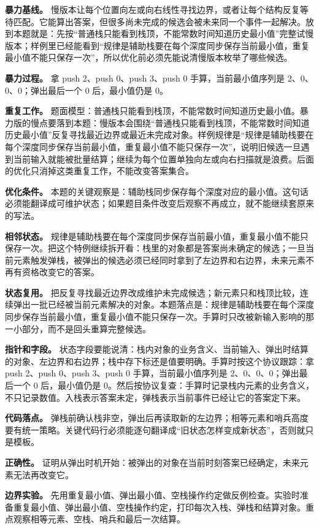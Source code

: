 \textbf{暴力基线。} 慢版本让每个位置向左或向右线性寻找边界，或者让每个结构反复等待匹配。它能算出答案，但很多尚未完成的候选会被未来同一个事件一起解决。放到本题就是：先按“普通栈只能看到栈顶，不能常数时间知道历史最小值”完整试慢版本；样例里已经能看到“规律是辅助栈要在每个深度同步保存当前最小值，重复最小值不能只保存一次”，所以优化前必须先能说清慢版本枚举了哪些候选。

\textbf{暴力过程。} 拿 push 2、push 0、push 3、push 0 手算，当前最小值序列是 2、0、0、0；弹出最后一个 0 后，最小值仍是 0。

\textbf{重复工作。} 题面模型：普通栈只能看到栈顶，不能常数时间知道历史最小值。暴力版的慢点要落到本题：慢版本会围绕“普通栈只能看到栈顶，不能常数时间知道历史最小值”反复寻找最近边界或最近未完成对象。样例规律是“规律是辅助栈要在每个深度同步保存当前最小值，重复最小值不能只保存一次”，说明旧候选一旦遇到当前输入就能被批量结算；继续为每个位置单独向左或向右扫描就是浪费。后面的优化只消掉这类重复工作，不能改变答案集合。

\textbf{优化条件。} 本题的关键观察是：辅助栈同步保存每个深度对应的最小值。这句话必须能翻译成可维护状态；如果题目条件改变后观察不再成立，就不能继续套原来的写法。

\textbf{相邻状态。} 规律是辅助栈要在每个深度同步保存当前最小值，重复最小值不能只保存一次。把这个特例继续拆开看：栈里的对象都是答案尚未确定的候选；一旦当前元素触发弹栈，被弹出的候选必须已经同时拿到了左边界和右边界，未来元素不再有资格改变它的答案。

\textbf{状态复用。} 把反复寻找最近边界改成维护未完成候选；新元素只和栈顶比较，连续弹出一批已经被当前元素解决的对象。本题落点是：规律是辅助栈要在每个深度同步保存当前最小值，重复最小值不能只保存一次。手算时只改被新输入影响的那一小部分，而不是回头重算完整候选。

\textbf{指针和字段。} 状态字段要能说清：栈内对象的业务含义、当前输入、弹出时结算的对象、左边界和右边界；栈中存下标还是值要明确。手算时按这个协议跟踪：拿 push 2、push 0、push 3、push 0 手算，当前最小值序列是 2、0、0、0；弹出最后一个 0 后，最小值仍是 0。然后按协议复查：手算时记录栈内元素的业务含义，不只记录数值。入栈表示答案未定，弹栈表示当前事件已经让它的答案定下来。

\textbf{代码落点。} 弹栈前确认栈非空，弹出后再读取新的左边界；相等元素和哨兵高度要有统一策略。关键代码行必须能逐句翻译成“旧状态怎样变成新状态”，否则就只是模板。

\textbf{正确性。} 证明从弹出时机开始：被弹出的对象在当前时刻答案已经确定，未来元素无法再改变它。

\textbf{边界实验。} 先用重复最小值、弹出最小值、空栈操作约定做反例检查。实验时准备重复最小值、弹出最小值、空栈操作约定，打印每次入栈、弹栈和结算对象。重点观察相等元素、空栈、哨兵和最后一次结算。

